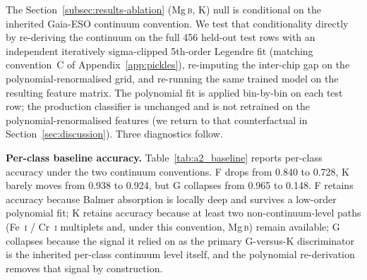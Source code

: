 \documentclass[11pt,a4paper]{article}
\newcommand{\Mgb}{Mg\,\textsc{b}\xspace}
\begin{document}
The Section~\ref{subsec:results-ablation} (\Mgb, K) null is conditional on the inherited Gaia-ESO continuum convention. We test that conditionality directly by re-deriving the continuum on the full 456 held-out test rows with an independent iteratively sigma-clipped 5th-order Legendre fit (matching convention~C of Appendix~\ref{app:pickles}), re-imputing the inter-chip gap on the polynomial-renormalised grid, and re-running the same trained model on the resulting feature matrix. The polynomial fit is applied bin-by-bin on each test row; the production classifier is unchanged and is not retrained on the polynomial-renormalised features (we return to that counterfactual in Section~\ref{sec:discussion}). Three diagnostics follow.

\textbf{Per-class baseline accuracy.} Table~\ref{tab:a2_baseline} reports per-class accuracy under the two continuum conventions. F drops from 0.840 to 0.728, K barely moves from 0.938 to 0.924, but G collapses from 0.965 to 0.148. F retains accuracy because Balmer absorption is locally deep and survives a low-order polynomial fit; K retains accuracy because at least two non-continuum-level paths (Fe~\textsc{i} / Cr~\textsc{i} multiplets and, under this convention, \Mgb) remain available; G collapses because the signal it relied on as the primary G-versus-K discriminator is the inherited per-class continuum level itself, and the polynomial re-derivation removes that signal by construction.
\end{document}

